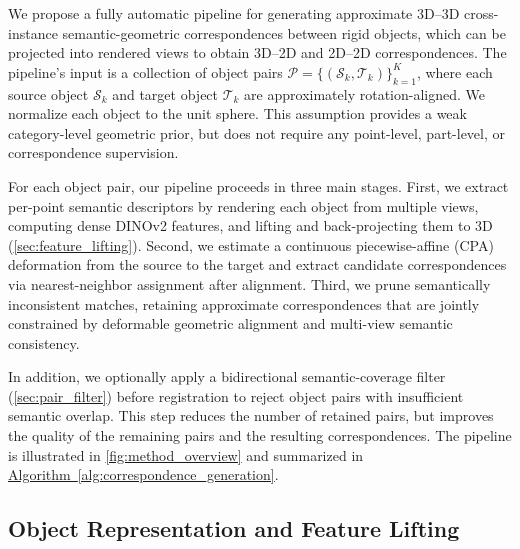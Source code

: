 

We propose a fully automatic pipeline for generating approximate 3D--3D cross-instance semantic-geometric correspondences between rigid objects, which can be projected into rendered views to obtain 3D--2D and 2D--2D correspondences.
%
The pipeline's input is a collection of object pairs
\(\mathcal{P}=\{(\mathcal{S}_k,\mathcal{T}_k)\}_{k=1}^{K}\), where each source object \(\mathcal{S}_k\) and target object \(\mathcal{T}_k\) are approximately rotation-aligned. We normalize each object to the unit sphere.
This assumption provides a weak category-level geometric prior, but does not require any point-level, part-level, or correspondence supervision. 

For each object pair, our pipeline proceeds in three main stages.
First, we extract per-point semantic descriptors by rendering each object from multiple views, computing dense DINOv2 features, and lifting and back-projecting them to 3D (\autoref{sec:feature_lifting}).
Second, we estimate a continuous piecewise-affine (CPA) deformation from the source to the target and extract candidate correspondences via nearest-neighbor assignment after alignment.
Third, we prune semantically inconsistent matches, retaining approximate correspondences that are jointly constrained by deformable geometric alignment and multi-view semantic consistency.

In addition, we optionally apply a bidirectional semantic-coverage filter (\autoref{sec:pair_filter}) before registration to reject object pairs with insufficient semantic overlap.
This step reduces the number of retained pairs, but improves the quality of the remaining pairs and the resulting correspondences.
The pipeline is illustrated in \autoref{fig:method_overview}
and summarized in \hyperref[alg:correspondence_generation]{Algorithm~\ref*{alg:correspondence_generation}}.

\subsection{Object Representation and Feature Lifting}
\label{sec:feature_lifting}

